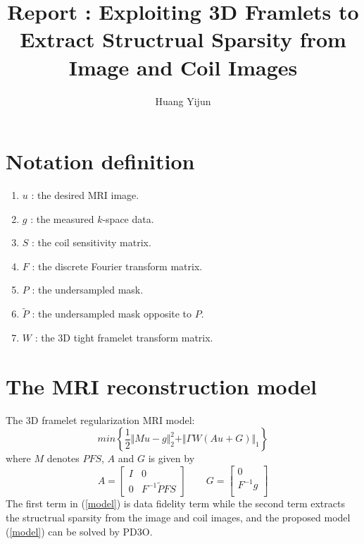 \documentclass[UTF8]{article}
\begin{document}
	\author{Huang Yijun}
\title{Report : Exploiting 3D Framlets to Extract Structrual Sparsity from Image and Coil Images}
\maketitle

\section{Notation definition}
\begin{enumerate}
	\item $u$ : the desired MRI image.
	\item $g$ : the measured $k$-space data.
	\item $S$ : the coil sensitivity matrix.
	\item $F$ : the discrete Fourier transform matrix.
	\item $P$ : the undersampled mask.
	\item $\tilde{P}$ : the undersampled mask opposite to $P$.
	\item $W$ : the 3D tight framelet transform matrix.
\end{enumerate}

\section{The MRI reconstruction model}
\par The 3D framelet regularization MRI model:
\begin{equation} \label{model}
	min \left\{ \frac{1}{2} \Vert Mu-g \Vert_2^2 + \Vert \Gamma W (A u + G)\Vert_1  \right\}
\end{equation}
where $M$ denotes $PFS$, $A$ and $G$ is given by
\begin{equation}
	A = \begin{bmatrix}
		I & 0 \\
		0 & F^{-1}\tilde{P}FS
	\end{bmatrix}
	\qquad
 	G = \begin{bmatrix}
 		0 \\
 		F^{-1}g \\
 	\end{bmatrix}
\end{equation}
The first term in (\ref{model}) is data fidelity term  while the second term extracts the structrual sparsity from the image and coil images, and the proposed model (\ref{model}) can be solved by PD3O.
\end{document}
